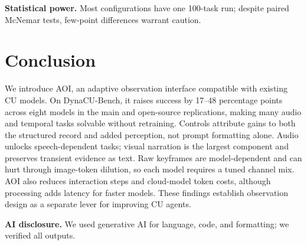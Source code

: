 \documentclass[letterpaper]{article} %
\begin{document}
\textbf{Statistical power.}
Most configurations have one 100-task run; despite paired McNemar tests,
few-point differences warrant caution.

\section{Conclusion}
\label{sec:conclusion}

We introduce AOI, an adaptive observation interface compatible with existing CU models. On DynaCU-Bench, it raises success by 17--48 percentage points across eight models in the main and open-source replications, making many audio and temporal tasks solvable without retraining. Controls attribute gains to both the structured record and added perception, not prompt formatting alone. Audio unlocks speech-dependent tasks; visual narration is the largest component and preserves transient evidence as text. Raw keyframes are model-dependent and can hurt through image-token dilution, so each model requires a tuned channel mix. AOI also reduces interaction steps and cloud-model token costs, although processing adds latency for faster models. These findings establish observation design as a separate lever for improving CU agents.

\noindent\textbf{AI disclosure.} We used generative AI for language, code, and formatting; we verified all outputs.


\end{document}
